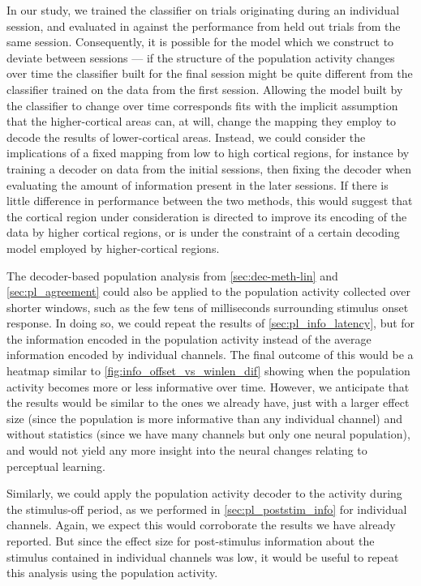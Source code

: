In our study, we trained the classifier on trials originating during an individual session, and evaluated in against the performance from held out trials from the same session.
Consequently, it is possible for the model which we construct to deviate between sessions --- if the structure of the population activity changes over time the classifier built for the final session might be quite different from the classifier trained on the data from the first session.
Allowing the model built by the classifier to change over time corresponds fits with the implicit assumption that the higher-cortical areas can, at will, change the mapping they employ to decode the results of lower-cortical areas.
Instead, we could consider the implications of a fixed mapping from low to high cortical regions, for instance by training a decoder on data from the initial sessions, then fixing the decoder when evaluating the amount of information present in the later sessions.
If there is little difference in performance between the two methods, this would suggest that the cortical region under consideration is directed to improve its encoding of the data by higher cortical regions, or is under the constraint of a certain decoding model employed by higher-cortical regions.

The decoder-based population analysis from \autoref{sec:dec-meth-lin} and \autoref{sec:pl_agreement} could also be applied to the population activity collected over shorter windows, such as the few tens of milliseconds surrounding stimulus onset response.
In doing so, we could repeat the results of \autoref{sec:pl_info_latency}, but for the information encoded in the population activity instead of the average information encoded by individual channels.
The final outcome of this would be a heatmap similar to \autoref{fig:info_offset_vs_winlen_dif} showing when the population activity becomes more or less informative over time.
However, we anticipate that the results would be similar to the ones we already have, just with a larger effect size (since the population is more informative than any individual channel) and without statistics (since we have many channels but only one neural population), and would not yield any more insight into the neural changes relating to perceptual learning.

Similarly, we could apply the population activity decoder to the activity during the stimulus-off period, as we performed in \autoref{sec:pl_poststim_info} for individual channels.
Again, we expect this would corroborate the results we have already reported.
But since the effect size for post-stimulus information about the stimulus contained in individual channels was low, it would be useful to repeat this analysis using the population activity.

